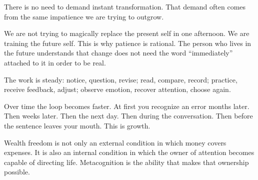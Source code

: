 There is no need to demand instant transformation. That demand often comes from the same impatience we are trying to outgrow.

We are not trying to magically replace the present self in one afternoon. We are training the future self. This is why patience is rational. The person who lives in the future understands that change does not need the word ``immediately'' attached to it in order to be real.

The work is steady: notice, question, revise; read, compare, record; practice, receive feedback, adjust; observe emotion, recover attention, choose again.

Over time the loop becomes faster. At first you recognize an error months later. Then weeks later. Then the next day. Then during the conversation. Then before the sentence leaves your mouth. This is growth.

Wealth freedom is not only an external condition in which money covers expenses. It is also an internal condition in which the owner of attention becomes capable of directing life. Metacognition is the ability that makes that ownership possible.
